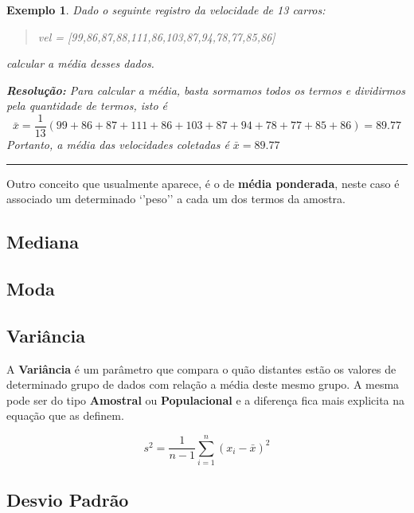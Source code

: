 \documentclass[
]{book}
\newtheorem{example}{Exemplo}
\begin{document}
\begin{example}
Dado o seguinte registro da velocidade de 13 carros:

\begin{quote}
vel = {[}99,86,87,88,111,86,103,87,94,78,77,85,86{]}
\end{quote}

calcular a média desses dados.

\textbf{Resolução:} Para calcular a média, basta sormamos todos os termos e dividirmos pela quantidade de termos, isto é
\[
\bar{x} = \frac{1}{13}(99+86+87+111+86+103+87+94+78+77+85+86) = 89.77
\]
Portanto, a média das velocidades coletadas é \(\bar{x} = 89.77\)
\end{example}

\begin{center}\rule{0.5\linewidth}{0.5pt}\end{center}

Outro conceito que usualmente aparece, é o de \textbf{média ponderada}, neste caso é associado um determinado `'peso'' a cada um dos termos da amostra.

\hypertarget{mediana}{%
\subsection{Mediana}\label{mediana}}

\hypertarget{moda}{%
\subsection{Moda}\label{moda}}

\hypertarget{variuxe2ncia}{%
\subsection{Variância}\label{variuxe2ncia}}

A \textbf{Variância} é um parâmetro que compara o quão distantes estão os valores de determinado grupo de dados com relação a média deste mesmo grupo. A mesma pode ser do tipo \textbf{Amostral} ou \textbf{Populacional} e a diferença fica mais explicita na equação que as definem.

\begin{equation}
s^2 =  \frac{1}{n-1}\sum_{i=1}^n(x_i - \bar{x})^2
\end{equation}

\hypertarget{desvio-padruxe3o}{%
\subsection{Desvio Padrão}\label{desvio-padruxe3o}}
\end{document}
